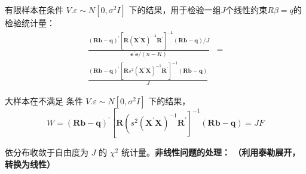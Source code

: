 有限样本在条件 $ V . \varepsilon \sim N\left[0, \sigma^{2} I\right] $ 下的结果，用于检验一组$ J $个线性约束$ R \beta =q $的检验统计量：
$$ \begin{aligned}
    \frac{\boldsymbol{(R b-q)^{\prime}\left[R\left(X^{\prime} X\right)^{-1} R^{\prime}\right]^{-1}(R b-q)} / J}{\boldsymbol{e^{\prime} e} /(n-K)} & = \\
    \frac{\boldsymbol{(R b-q)^{\prime}}\left[\boldsymbol{R} s^{2}\left(\boldsymbol{X^{\prime} X}\right)^{-1} \boldsymbol{R^{\prime}}\right]^{-1}
    (\boldsymbol{R b-q})}{J}
    \end{aligned} $$

大样本在不满足 条件 $ V . \varepsilon \sim N\left[0, \sigma^{2} I\right] $ 下的结果，
    $$ W=(\boldsymbol{R b-q})^{\prime}\left[\boldsymbol{R}\left(s^{2}\left(\boldsymbol{X^{\prime} X}\right)^{-1} \boldsymbol{R^{\prime}}\right]^{-1}
    (\boldsymbol{R b-q}) = JF \right. $$

依分布收敛于自由度为 $J $ 的 $\chi^{2}$  统计量。{\bf 非线性问题的处理： （利用泰勒展开，转换为线性）}